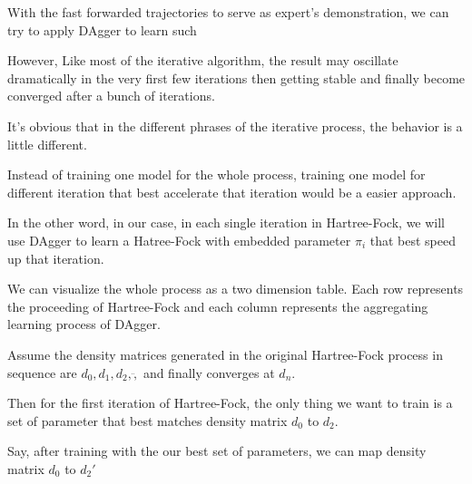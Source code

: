 \documentclass[twoside]{article}
\begin{document}
With the fast forwarded trajectories to serve as expert's demonstration, we can try to apply DAgger to learn such 

However,
Like most of the iterative algorithm, the result may oscillate dramatically in the very first few iterations then getting stable and finally become converged after a bunch of iterations. 

It's obvious that in the different phrases of the iterative process, the behavior is a little different. 


Instead of training one model for the whole process,
training one model for different iteration that best accelerate that iteration would be a easier approach.




% 

In the other word, in our case, in each single iteration in Hartree-Fock,  we will use DAgger to learn a Hatree-Fock with embedded parameter $\pi_i$ that best speed up that iteration.  


We can visualize the whole process as a two dimension table.
Each row represents the proceeding of Hartree-Fock and each column represents the aggregating learning process of DAgger.
 

Assume the density matrices generated in the original Hartree-Fock process in sequence are  $d_0, d_1, d_2, \ddot,$ and finally converges at $d_n$.

Then for the first iteration of Hartree-Fock, the only thing we want to train is a set of parameter that best matches density matrix $d_0$ to $d_2$. 


Say, after training with the our best set of parameters, we can map density matrix $d_0$ to $d_{2}'$
\end{document}
